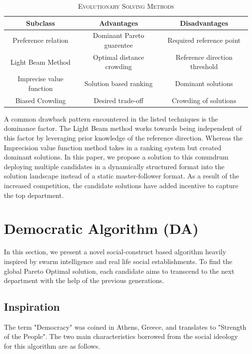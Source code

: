 \documentclass[conference]{IEEEtran}
\begin{document}
\begin{table}

\caption{\textsc{Evolutionary Solving Methods}}
\label{tab2}
\centering
{
\begin{tabular}{| c | c | c |}
\hline
\textbf{Subclass}&\textbf{Advantages}&\textbf{Disadvantages}\\
\hline
Preference relation \cite{kim}&Dominant Pareto guarentee&Required reference point\\
\hline
Light Beam Method \cite{an}&Optimal distance crowding&Reference direction threshold\\
\hline
Imprecise value function \cite{lim}&Solution based ranking&Dominant solutions\\
\hline
Biased Crowding&Desired trade-off&Crowding of solutions\\
\hline
\end{tabular}
}
\end{table}

A common drawback pattern encountered in the listed techniques is the dominance factor. The Light Beam method works towards being independent of this factor by leveraging prior knowledge of the reference direction. Whereas the Imprecision value function method takes in a ranking system but created dominant solutions. In this paper, we propose a solution to this conundrum deploying multiple candidates in a dynamically structured format into the solution landscape instead of a static master-follower format. As a result of the increased competition, the candidate solutions have added incentive to capture the top department. 



\section{Democratic Algorithm (DA)}

In this section, we present a novel social-construct based algorithm heavily inspired by swarm intelligence and real life social establishments. To find the global Pareto Optimal solution, each candidate aims to transcend to the next department with the help of the previous generations.  

\subsection{Inspiration}
The term "Democracy" was coined in Athens, Greece, and translates to "Strength of the People". The two main characteristics borrowed from the social ideology for this algorithm are as follows.
\end{document}
